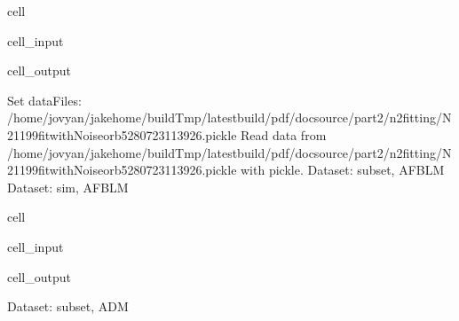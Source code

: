 \documentclass[letterpaper,table,10pt,english]{jupyterBook}
\begin{document}
\begin{sphinxuseclass}{cell}
\begin{sphinxVerbatimInput}
\begin{sphinxuseclass}{cell_input}
\begin{sphinxVerbatim}[commandchars=\\\{\}]
\end{sphinxVerbatim}

\end{sphinxuseclass}\end{sphinxVerbatimInput}
\begin{sphinxVerbatimOutput}

\begin{sphinxuseclass}{cell_output}
\begin{sphinxVerbatim}[commandchars=\\\{\}]
Set dataFiles: /home/jovyan/jake\PYGZhy{}home/buildTmp/\PYGZus{}latest\PYGZus{}build/pdf/doc\PYGZhy{}source/part2/n2fitting/N2\PYGZus{}1199\PYGZus{}fit\PYGZus{}withNoise\PYGZus{}orb5\PYGZus{}280723\PYGZus{}11\PYGZhy{}39\PYGZhy{}26.pickle
Read data from /home/jovyan/jake\PYGZhy{}home/buildTmp/\PYGZus{}latest\PYGZus{}build/pdf/doc\PYGZhy{}source/part2/n2fitting/N2\PYGZus{}1199\PYGZus{}fit\PYGZus{}withNoise\PYGZus{}orb5\PYGZus{}280723\PYGZus{}11\PYGZhy{}39\PYGZhy{}26.pickle with pickle.
Dataset: subset, AFBLM
Dataset: sim, AFBLM
\end{sphinxVerbatim}

\noindent{}

\end{sphinxuseclass}\end{sphinxVerbatimOutput}

\end{sphinxuseclass}
\begin{sphinxuseclass}{cell}\begin{sphinxVerbatimInput}

\begin{sphinxuseclass}{cell_input}
\begin{sphinxVerbatim}[commandchars=\\\{\}]
  
\end{sphinxVerbatim}

\end{sphinxuseclass}\end{sphinxVerbatimInput}
\begin{sphinxVerbatimOutput}

\begin{sphinxuseclass}{cell_output}
\begin{sphinxVerbatim}[commandchars=\\\{\}]
Dataset: subset, ADM
\end{sphinxVerbatim}

\noindent{}

\end{sphinxuseclass}\end{sphinxVerbatimOutput}

\end{sphinxuseclass}
\end{document}
